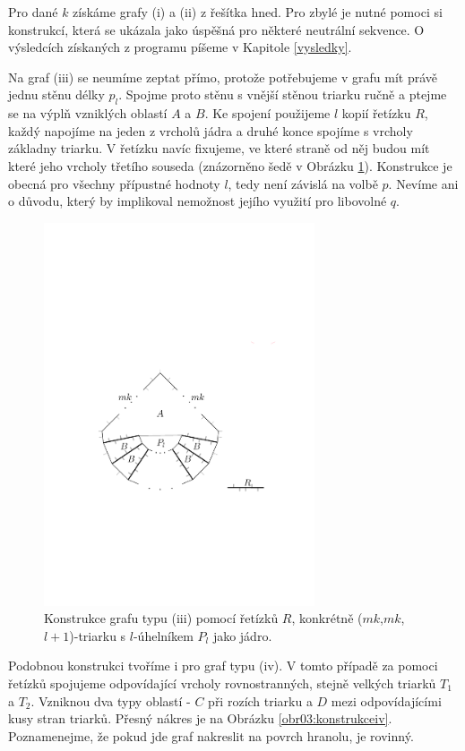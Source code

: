 Pro dané $k$ získáme grafy (i) a (ii) z řešítka hned. Pro zbylé je nutné pomoci si konstrukcí, která se ukázala jako úspěšná pro některé neutrální sekvence. O výsledcích získaných z programu píšeme v Kapitole \ref{vysledky}.

Na graf (iii) se neumíme zeptat přímo, protože potřebujeme v grafu mít právě jednu stěnu délky $p_l$. Spojme proto stěnu s vnější stěnou triarku ručně a ptejme se na výplň vzniklých oblastí $A$ a $B$. Ke spojení použijeme $l$ kopií řetízku $R$, každý napojíme na jeden z vrcholů jádra a druhé konce spojíme s  vrcholy základny triarku. V řetízku navíc fixujeme, ve které straně od něj budou mít které jeho vrcholy třetího souseda (znázorněno šedě v Obrázku \ref{obr03:konstrukceiii}). Konstrukce je obecná pro všechny přípustné hodnoty $l$, tedy není závislá na volbě $p$. Nevíme ani o důvodu, který by implikoval nemožnost jejího využití pro libovolné $q$.

\begin{figure}[h]\centering
\includegraphics[width = 80mm]{../img/iii-construction}
\caption{Konstrukce grafu typu (iii) pomocí řetízků $R$, konkrétně ($mk$,$mk$,$l+1$)-triarku s $l$-úhelníkem $P_l$ jako jádro.}
\label{obr03:konstrukceiii}
\end{figure}

Podobnou konstrukci tvoříme i pro graf typu (iv). V tomto případě za pomoci řetízků spojujeme odpovídající vrcholy rovnostranných, stejně velkých triarků $T_1$ a $T_2$. Vzniknou dva typy oblastí - $C$ při rozích triarku a $D$ mezi odpovídajícími kusy stran triarků. Přesný nákres je na Obrázku \ref{obr03:konstrukceiv}. Poznamenejme, že pokud jde graf nakreslit na povrch hranolu, je rovinný. 


